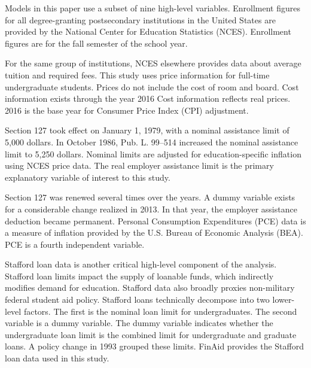 \documentclass[review]{elsarticle}
\begin{document}
Models in this paper use a subset of nine high-level variables.
Enrollment figures for all degree-granting postsecondary institutions in the United States
are provided by the National Center for Education Statistics (NCES)\cite{nces_2019}.
Enrollment figures are for the fall semester of the school year.

For the same group of institutions,
NCES elsewhere provides data about average tuition and required fees\cite{nces_2017}.
This study uses price information for full-time undergraduate students.
Prices do not include the cost of room and board.
Cost information exists through the year 2016
Cost information reflects real prices.
2016 is the base year for Consumer Price Index (CPI) adjustment.

Section 127 took effect on January 1, 1979, with a nominal assistance limit of 5,000 dollars\cite{plaw95_600_1978}.
In October 1986, Pub. L. 99–514 increased the nominal assistance limit to 5,250 dollars\cite{plaw99_514_1986}.
Nominal limits are adjusted for education-specific inflation using NCES price data.
The real employer assistance limit is the primary explanatory variable of interest to this study.

Section 127 was renewed several times over the years.
A dummy variable exists for a considerable change realized in 2013.
In that year, the employer assistance deduction became permanent.
Personal Consumption Expenditures (PCE) data is a measure of inflation provided by the U.S. Bureau of Economic Analysis (BEA)\cite{bea_2020}.
PCE is a fourth independent variable.

Stafford loan data is another critical high-level component of the analysis.
Stafford loan limits impact the supply of loanable funds, which indirectly modifies demand for education.
Stafford data also broadly proxies non-military federal student aid policy.
Stafford loans technically decompose into two lower-level factors.
The first is the nominal loan limit for undergraduates.
The second variable is a dummy variable.
The dummy variable indicates whether the undergraduate loan limit is the combined limit for undergraduate and graduate loans.
A policy change in 1993 grouped these limits.
FinAid provides the Stafford loan data used in this study\cite{finaid_2020}.
\end{document}
